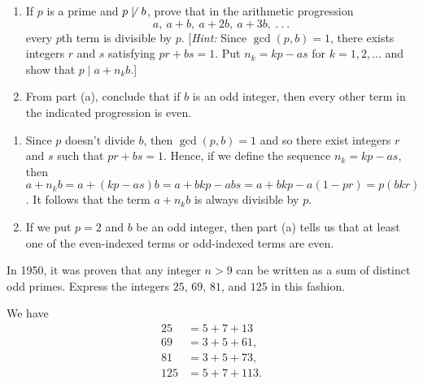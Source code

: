 \begin{exercise}
    \begin{enumerate}
        \item If $p$ is a prime and $p \not \mid \ b$, prove that in the arithmetic progression
        $$a, \ a + b, \ a + 2b, \ a+3b, \ . \ . \ .$$
        every $p$th term is divisible by $p$. [\textit{Hint:} Since $\gcd(p,b) = 1$, there exists integers $r$ and $s$ satisfying $pr + bs = 1$. Put $n_k = kp - as$ for $k=1,2,...$ and show that $p \mid a + n_k b$.]
        \item From part (a), conclude that if $b$ is an odd integer, then every other term in the indicated progression is even.
    \end{enumerate}
\end{exercise}

\begin{solution}
    \begin{enumerate}
        \item Since $p$ doesn't divide $b$, then $\gcd(p,b) = 1$ and so there exist integers $r$ and $s$ such that $pr + bs = 1$. Hence, if we define the sequence $n_k = kp - as$, then $a + n_kb = a + (kp - as)b = a + bkp - abs = a + bkp - a(1 - pr) = p(bk r)$. It follows that the term $a + n_kb$ is always divisible by $p$.
        \item If we put $p = 2$ and $b$ be an odd integer, then part (a) tells us that at least one of the even-indexed terms or odd-indexed terms are even.
    \end{enumerate}
\end{solution}

\begin{exercise}
    In 1950, it was proven that any integer $n > 9$ can be written as a sum of distinct odd primes. Express the integers $25$, $69$, $81$, and $125$ in this fashion. \\
\end{exercise}

\begin{solution}
    We have
    \begin{align*}
        25 &= 5+7+13\\
        69 &= 3 + 5 + 61, \\
        81 &= 3 + 5 + 73, \\
        125 &= 5 + 7 + 113.\\
    \end{align*}
\end{solution}

